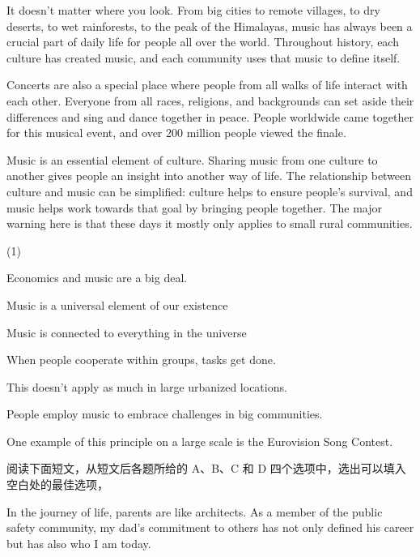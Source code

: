 \documentclass{英语试卷}
\begin{document}
\par {} It doesn't matter where you look. From big cities to remote villages, to dry deserts, to wet rainforests, to the peak of the Himalayas, music has always been a crucial part of daily life for people all over the world. Throughout history, each culture has created music, and each community uses that music to define itself.\par
\par Concerts are also a special place where people from all walks of life interact with each other. Everyone from all races, religions, and backgrounds can set aside their differences and sing and dance together in peace.  People worldwide came together for this musical event, and over 200 million people viewed the finale.\par
\par Music is an essential element of culture. Sharing music from one culture to another gives people an insight into another way of life. The relationship between culture and music can be simplified: culture helps to ensure people's survival, and music helps work towards that goal by bringing people together. The major warning here is that these days it mostly only applies to small rural communities. \par
\begin{choices}(1)
  \item Economics and music are a big deal.
  \item Music is a universal element of our existence
  \item Music is connected to everything in the universe
  \item When people cooperate within groups, tasks get done.
  \item This doesn't apply as much in large urbanized locations.
  \item People employ music to embrace challenges in big communities.
  \item One example of this principle on a large scale is the Eurovision Song Contest.
\end{choices}
\par 阅读下面短文，从短文后各题所给的 A、B、C 和 D 四个选项中，选出可以填入空白处的最佳选项，\par
\par In the journey of life, parents are like architects. As a  member of the public safety community, my dad's commitment to  others has not only defined his career but has also  who I am today.\par
\end{document}

